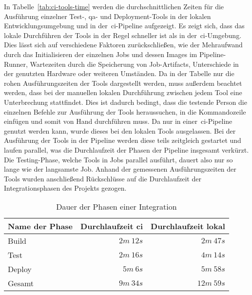 In Tabelle\ \ref{tab:ci-tools-time} werden die durchschnittlichen Zeiten für die Ausführung einzelner Test-,
\acrshort{qa}- und Deployment-Tools in der lokalen Entwicklungsumgebung und in der\ \acrshort{ci}-Pipeline aufgezeigt.
Es zeigt sich, dass das lokale Durchführen der Tools in der Regel schneller ist als in der\ \acrshort{ci}-Umgebung.
Dies lässt sich auf verschiedene Faktoren zurückschließen, wie der Mehraufwand durch das Initialisieren der einzelnen
Jobs und dessen Images im Pipeline-Runner, Wartezeiten durch die Speicherung von Job-Artifacts, Unterschiede in
der genutzten Hardware oder weiteren Umständen.
Da in der Tabelle nur die rohen Ausführungszeiten der Tools dargestellt werden, muss außerdem beachtet werden, dass bei
der manuellen lokalen Durchführung zwischen jedem Tool eine Unterbrechung stattfindet.
Dies ist dadurch bedingt, dass die testende Person die einzelnen Befehle zur Ausführung der Tools heraussuchen, in die
Kommandozeile einfügen und somit von Hand durchführen muss.
Da  nur in einer\ \acrshort{ci}-Pipeline genutzt werden kann, wurde dieses bei den lokalen Tools
ausgelassen.
Bei der Ausführung der Tools in der Pipeline werden diese teils zeitgleich gestartet und laufen parallel, was die
Durchlaufzeit der Phasen der Pipeline insgesamt verkürzt.
Die Testing-Phase, welche Tools in Jobs parallel ausführt, dauert also nur so lange wie der langsamste Job.
Anhand der gemessenen Ausführungszeiten der Tools wurden anschließend Rückschlüsse auf die Durchlaufzeit der
Integrationsphasen des Projekts gezogen.

\begin{table}[H]
    \centering
    \begin{tabular}{|p{4cm}||p{4cm}|p{4cm}|}
        \hline
        Name der Phase & Durchlaufzeit \acrshort{ci} & Durchlaufzeit lokal         \\
        \hline
        Build  & \multicolumn{1}{r|}{$2m\ 12s$}  & \multicolumn{1}{r|}{$2m\ 47s$}  \\
        Test   & \multicolumn{1}{r|}{$2m\ 16s$}  & \multicolumn{1}{r|}{$4m\ 14s$}  \\
        Deploy & \multicolumn{1}{r|}{$5m\ 6s$}   & \multicolumn{1}{r|}{$5m\ 58s$}  \\
        \hline
        Gesamt & \multicolumn{1}{|r|}{$9m\ 34s$} & \multicolumn{1}{r|}{$12m\ 59s$} \\
        \hline
    \end{tabular}
    \caption{Dauer der Phasen einer Integration}
    \label{tab:integrations-time}
\end{table}

